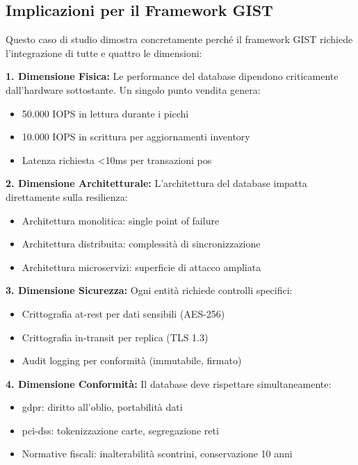 \subsection{\texorpdfstring{Implicazioni per il Framework GIST}{2.3.5.4 - Implicazioni per il Framework GIST}}
\label{subsec:implicazioni_gist}

Questo caso di studio dimostra concretamente perché il framework GIST richiede l'integrazione di tutte e quattro le dimensioni:

\textbf{1. Dimensione Fisica:} Le performance del database dipendono criticamente dall'hardware sottostante. Un singolo punto vendita genera:
\begin{itemize}
\item 50.000 IOPS in lettura durante i picchi
\item 10.000 IOPS in scrittura per aggiornamenti inventory
\item Latenza richiesta <10ms per transazioni \gls{pos}
\end{itemize}

\textbf{2. Dimensione Architetturale:} L'architettura del database impatta direttamente sulla resilienza:
\begin{itemize}
\item Architettura monolitica: single point of failure
\item Architettura distribuita: complessità di sincronizzazione
\item Architettura microservizi: superficie di attacco ampliata
\end{itemize}

\textbf{3. Dimensione Sicurezza:} Ogni entità richiede controlli specifici:
\begin{itemize}
\item Crittografia at-rest per dati sensibili (AES-256)
\item Crittografia in-transit per replica (TLS 1.3)
\item Audit logging per conformità (immutabile, firmato)
\end{itemize}

\textbf{4. Dimensione Conformità:} Il database deve rispettare simultaneamente:
\begin{itemize}
\item \gls{gdpr}: diritto all'oblio, portabilità dati
\item \gls{pci-dss}: tokenizzazione carte, segregazione reti
\item Normative fiscali: inalterabilità scontrini, conservazione 10 anni
\end{itemize}

